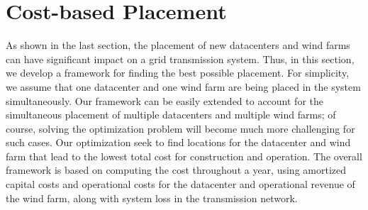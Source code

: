 \section{Cost-based Placement}
\label{sec:framework}

As shown in the last section, the placement of new datacenters and wind farms can have significant impact on a grid transmission system.  Thus, in this section, we develop a framework for finding the best possible placement.  For simplicity, we assume that one datacenter and one wind farm are being placed in the system simultaneously.  Our framework can be easily extended to account for the simultaneous placement of multiple datacenters and multiple wind farms; of course, solving the optimization problem will become much more challenging for such cases.  Our optimization seek to find locations for the datacenter and wind farm that lead to the lowest total cost for construction and operation.  The overall framework is based on computing the cost throughout a year, using amortized capital costs and operational costs for the datacenter and operational revenue of the wind farm, along with system loss in the transmission network.


